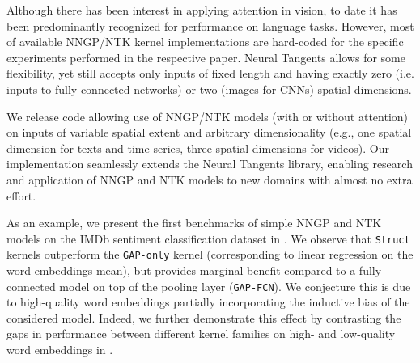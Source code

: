 \documentclass{article}
\begin{document}
Although there has been interest in applying attention in vision, to date it has been predominantly recognized for performance on  language tasks. However, most of available NNGP/NTK kernel implementations  \citep{matthews2018gaussian, lee2018deep, garriga2019deep, arora2019, yang2019v2, li2019enhanced} are hard-coded for the specific experiments performed in the respective paper. Neural Tangents \citep{novak2020neural} allows for some flexibility, yet still accepts only inputs of fixed length and having exactly zero (i.e. inputs to fully connected networks) or two (images for CNNs) spatial dimensions.

We release code allowing use of NNGP/NTK models (with or without attention) on inputs of variable spatial extent and arbitrary dimensionality (e.g., one spatial dimension for texts and time series, three spatial dimensions for videos).
Our implementation seamlessly extends the Neural Tangents library, enabling research and application of NNGP and NTK models to new domains with almost no extra effort.

As an example, we present the first benchmarks of simple NNGP and NTK models on the IMDb sentiment classification dataset in . We observe that \texttt{Struct} kernels outperform the \texttt{GAP-only} kernel (corresponding to linear regression on the word embeddings mean), but provides marginal benefit compared to a fully connected model on top of the pooling layer (\texttt{GAP-FCN}). We conjecture this is due to high-quality word embeddings  partially incorporating the inductive bias of the considered model. Indeed, we further demonstrate this effect by contrasting the gaps in performance between different kernel families on high- and low-quality word embeddings in .
\end{document}
